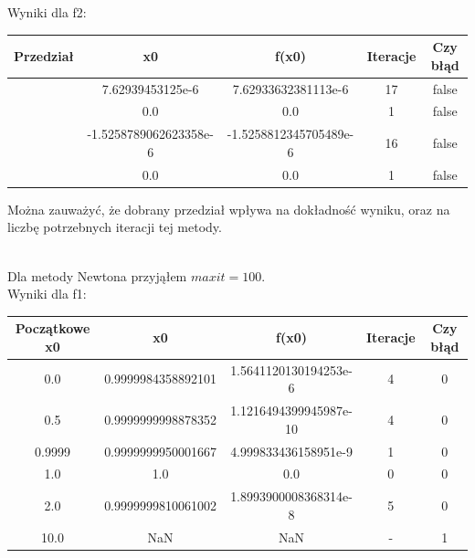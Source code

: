 \documentclass[15pt, a4paper]{article}
\begin{document}
\noindent Wyniki dla f2:
\begin{table}[ht]
\begin{adjustbox}{max width=\textwidth}
\begin{tabular}{|c|c|c|c|c|}
    \hline
    \textbf{Przedział} & \textbf{x0} & \textbf{f(x0)} & \textbf{Iteracje} & \textbf{Czy błąd} \\
    \hline
    [0.0, 1.0] & 7.62939453125e-6 & 7.62933632381113e-6 & 17 & false \\
    \hline
    [-1.0, 1.0] & 0.0 & 0.0 & 1 & false \\
    \hline
    [-0.4, 0.5] & -1.5258789062623358e-6 & -1.5258812345705489e-6 & 16 & false \\
    \hline
    [-0.5, 0.5] & 0.0 & 0.0 & 1 & false \\
    \hline
\end{tabular}
\end{adjustbox}
\end{table}

\noindent Można zauważyć, że dobrany przedział wpływa na dokładność wyniku, oraz na liczbę potrzebnych iteracji tej metody.\\\\

\pagebreak

\noindent Dla metody Newtona przyjąłem \(maxit = 100 \).\\

\noindent Wyniki dla f1:
\begin{table}[ht]
\begin{adjustbox}{max width=\textwidth}
\begin{tabular}{|c|c|c|c|c|}
    \hline
    \textbf{Początkowe x0} & \textbf{x0} & \textbf{f(x0)} & \textbf{Iteracje} & \textbf{Czy błąd} \\
    \hline
    0.0 & 0.9999984358892101 & 1.5641120130194253e-6 & 4 & 0 \\
    \hline
    0.5 & 0.9999999998878352 & 1.1216494399945987e-10 & 4 & 0 \\
    \hline
    0.9999 & 0.9999999950001667 & 4.999833436158951e-9 & 1 & 0 \\
    \hline
    1.0 & 1.0 & 0.0 & 0 & 0 \\
    \hline
    2.0 & 0.9999999810061002 & 1.8993900008368314e-8 & 5 & 0 \\
    \hline
    10.0 & NaN & NaN & - & 1 \\
    \hline
\end{tabular}
\end{adjustbox}
\end{table}
\end{document}
